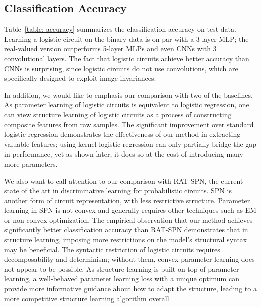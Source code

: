 \documentclass[letterpaper]{article} %
\begin{document}
\subsection{Classification Accuracy}
\label{s: classification accuracy}
Table~\ref{table: accuracy} summarizes the classification accuracy on test data. Learning a logistic circuit on the binary data is on par with a 3-layer MLP; the real-valued version outperforms 5-layer MLPs and even CNNs with 3 convolutional layers. The fact that logistic circuits achieve better accuracy than CNNs is surprising, since logistic circuits do not use convolutions, which are specifically designed to exploit image invariances. 

In addition, we would like to emphasis our comparison with two of the baselines. As parameter learning of logistic circuits is equivalent to logistic regression, one can view structure learning of logistic circuits as a process of constructing composite features from raw samples.  
The significant improvement over standard logistic regression demonstrates the effectiveness of our method in extracting valuable features; using kernel logistic regression can only partially bridge the gap in performance, yet as shown later, it does so at the cost of introducing many more parameters. 

We also want to call attention to our comparison with RAT-SPN, the current state of the art in discriminative learning for probabilistic circuits. SPN is another form of circuit representation, with less restrictive structure. Parameter learning in SPN is not convex and generally requires other techniques such as EM or non-convex optimization. The empirical observation that our method achieves significantly better classification accuracy than RAT-SPN demonstrates that in structure learning, imposing more restrictions on the model's structural syntax may be beneficial. The syntactic restriction of logistic circuits requires decomposability and determinism; without them, convex parameter learning does not appear to be possible. 
As structure learning is built on top of parameter learning, a well-behaved parameter learning loss with a unique optimum can provide more informative guidance about how to adapt the structure, leading to a more competitive structure learning algorithm overall.
\end{document}

